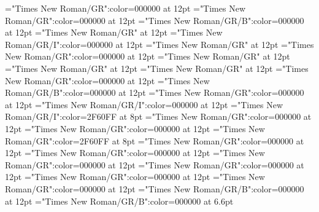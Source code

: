 \documentclass[a4paper]{article}
\begin{document}
\pagestyle{plain}
\sloppy
\setlength{\parfillskip}{0pt plus 1fil}
\font\xitemtpi="Times New Roman/GR":color=000000 at 12pt
\font\xitembzhfonipa="Times New Roman/GR":color=000000 at 12pt
\font\xitemxitemheadwordbefore="Times New Roman/GR/B":color=000000 at 12pt
\font\xitemxitemexamplesbefore="Times New Roman/GR" at 12pt
\font\xitemxitemexamplebefore="Times New Roman/GR/I":color=000000 at 12pt
\font\xitemxitemslotsbefore="Times New Roman/GR" at 12pt
\font\entrydicBody="Times New Roman/GR":color=000000 at 12pt
\font{}="Times New Roman/GR" at 12pt
\font{}="Times New Roman/GR" at 12pt
\font{}="Times New Roman/GR" at 12pt
\font\entryletDatadicBody="Times New Roman/GR":color=000000 at 12pt
\font\headwordbzhentryletDatadicBody="Times New Roman/GR/B":color=000000 at 12pt
\font\examplesentryletDatadicBody="Times New Roman/GR":color=000000 at 12pt
\font\examplebzhexamplesentryletDatadicBody="Times New Roman/GR/I":color=000000 at 12pt
\font\xlanguagetagenexamplebzhexamplesentryletDatadicBody="Times New Roman/GR/I":color=2F60FF at 8pt
\font\translationsexamplesentryletDatadicBody="Times New Roman/GR":color=000000 at 12pt
\font\translationentranslationsexamplesentryletDatadicBody="Times New Roman/GR":color=000000 at 12pt
\font\xlanguagetagentranslationentranslationsexamplesentryletDatadicBody="Times New Roman/GR":color=2F60FF at 8pt
\font\relationstranslationsexamplesentryletDatadicBody="Times New Roman/GR":color=000000 at 12pt
\font\xitemrelationstranslationsexamplesentryletDatadicBody="Times New Roman/GR":color=000000 at 12pt
\font\lexreftypeenxitemrelationstranslationsexamplesentryletDatadicBody="Times New Roman/GR":color=000000 at 12pt
\font\lexreftargetsxitemrelationstranslationsexamplesentryletDatadicBody="Times New Roman/GR":color=000000 at 12pt
\font\xitemlexreftargetsxitemrelationstranslationsexamplesentryletDatadicBody="Times New Roman/GR":color=000000 at 12pt
\font\sensecrossrefbzhxitemlexreftargetsxitemrelationstranslationsexamplesentryletDatadicBody="Times New Roman/GR":color=000000 at 12pt
\font\xsensenumberensensecrossrefbzhxitemlexreftargetsxitemrelationstranslationsexamplesentryletDatadicBody="Times New Roman/GR/B":color=000000 at 12pt
\font\xhomographnumberbzhsensecrossrefbzhxitemlexreftargetsxitemrelationstranslationsexamplesentryletDatadicBody="Times New Roman/GR/B":color=000000 at 6.6pt

\mbox{} 
\newpage 
\newpage 
\setcounter{page}{1} 
\pagestyle{fancy} 
\end{document}
